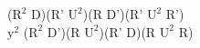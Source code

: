 ($\text{R}^2$ D)(R' $\text{U}^2$)(R D')(R' $\text{U}^2$ R')\\
$\text{y}^2$ ($\text{R}^2$ D')(R $\text{U}^2$)(R' D)(R $\text{U}^2$ R)\\
